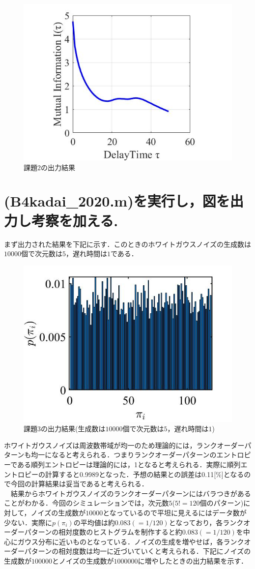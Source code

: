 \documentclass[autodetect-engine,dvipdfmx-if-dvi,ja=standard,a4paper,11pt]{bxjsarticle} %
\begin{document}
\begin{figure}[H]%
\begin{center}
\includegraphics[width=.4\textwidth]{kadai2_rusult.jpg}
\end{center}
\caption{課題2の出力結果}%
\label{fig:kadai2}
\end{figure}


\section{(B4kadai\_2020.m)を実行し，図を出力し考察を加える.}
まず出力された結果を下記に示す．このときのホワイトガウスノイズの生成数は$10000$個で次元数は$5$，遅れ時間は$1$である．

\begin{figure}[H]%
\begin{center}
\includegraphics[width=.4\textwidth]{kadai3_rusult.jpg}
\end{center}
\caption{課題3の出力結果(生成数は$10000$個で次元数は$5$，遅れ時間は$1$)}%
\label{fig:kadai3}
\end{figure}

ホワイトガウスノイズは周波数帯域が均一のため理論的には，ランクオーダーパターンも均一になると考えられる．つまりランクオーダーパターンのエントロピーである順列エントロピーは理論的には，1となると考えられる．実際に順列エントロピーの計算すると0.9989となった．予想の結果との誤差は0.11[\%]となるので今回の計算結果は妥当であると考えられる．\\
　結果からホワイトガウスノイズのランクオーダーパターンにはバラつきがあることがわかる．今回のシミュレーションでは，次元数$5$($5!=120$個のパターン)に対して，ノイズの生成数が$10000$となっているので平坦に見えるにはデータ数が少ない．実際に$p(\pi_i)$の平均値は約$0.083(=1/120)$となっており，各ランクオーダーパターンの相対度数のヒストグラムを制作すると約$0.083(=1/120)$を中心にガウス分布に近いものとなっている．ノイズの生成を増やせば，各ランクオーダーパターンの相対度数は均一に近づいていくと考えられる．下記にノイズの生成数が$100000$とノイズの生成数が$1000000$に増やしたときの出力結果を示す．
\end{document}
